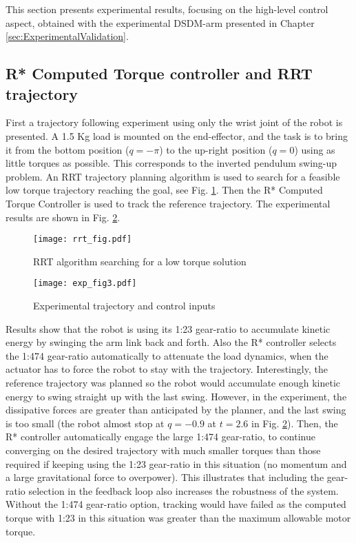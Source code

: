 This section presents experimental results, focusing on the high-level control aspect, obtained with the experimental DSDM-arm presented in Chapter \ref{sec:ExperimentalValidation}.

\subsection{R* Computed Torque controller and RRT trajectory}

First a trajectory following experiment using only the wrist joint of the robot is presented. A 1.5 Kg load is mounted on the end-effector, and the task is to bring it from the bottom position ($q=-\pi$) to the up-right position ($q=0$) using as little torques as possible. This corresponds to the inverted pendulum swing-up problem. An RRT trajectory planning algorithm is used to search for a feasible low torque trajectory reaching the goal, see Fig. \ref{fig:exp_rrt}. Then the R* Computed Torque Controller is used to track the reference trajectory. The experimental results are shown in Fig. \ref{fig:exp_traj}.
%
\begin{figure}[htp]
	\centering
		\texttt{[image: rrt\_fig.pdf]}
	\caption{RRT algorithm searching for a low torque solution}
	\label{fig:exp_rrt}
\end{figure}
%
\begin{figure}[htp]
	\centering
		\texttt{[image: exp\_fig3.pdf]}
	\caption{Experimental trajectory and control inputs}
	\label{fig:exp_traj}
	\vspace{-10pt}
\end{figure}
%
Results show that the robot is using its 1:23 gear-ratio to accumulate kinetic energy by swinging the arm link back and forth. Also the R* controller selects the 1:474 gear-ratio automatically to attenuate the load dynamics, when the actuator has to force the robot to stay with the trajectory.  Interestingly, the reference trajectory was planned so the robot would accumulate enough kinetic energy to swing straight up with the last swing. However, in the experiment, the dissipative forces are greater than anticipated by the planner, and the last swing is too small (the robot almost stop at $q=-0.9$ at $t=2.6$ in Fig. \ref{fig:exp_traj}). Then, the R* controller automatically engage the large 1:474 gear-ratio, to continue converging on the desired trajectory with much smaller torques than those required if keeping using the 1:23 gear-ratio in this situation (no momentum and a large gravitational force to overpower). This illustrates that including the gear-ratio selection in the feedback loop also increases the robustness of the system. Without the 1:474 gear-ratio option, tracking would have failed as the computed torque with 1:23 in this situation was greater than the maximum allowable motor torque.


